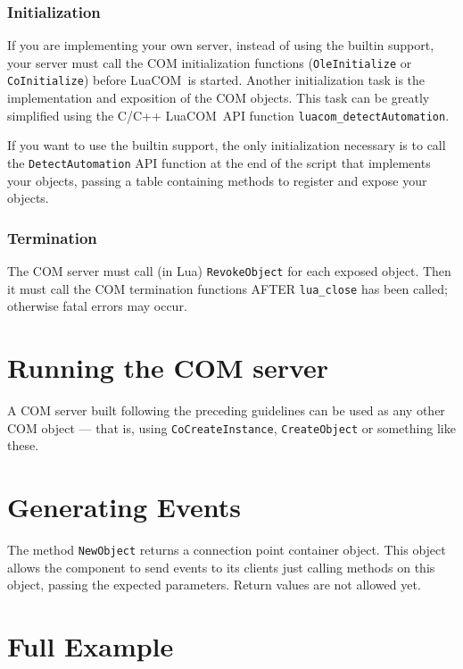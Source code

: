 \documentclass[11pt,a4paper,english]{report}
\newcommand{\techname}[1]{\mbox{#1}}
\newcommand{\luacom}{\techname{LuaCOM}}
\begin{document}
\subsubsection*{Initialization}

If you are implementing your own server, instead of using the builtin support, your server
must call the COM initialization functions (\texttt{OleInitialize} or \texttt{CoInitialize}) before \luacom\ is
started. Another initialization task is the implementation and
exposition of the COM objects. This task can be greatly simplified
using the C/C++ \luacom\ API function \verb+luacom_detectAutomation+.

If you want to use the builtin support, the only initialization necessary is to call
the \verb+DetectAutomation+ API function at the end of the script that implements your objects,
passing a table containing methods to register and expose your objects.

\subsubsection*{Termination}
The COM server must call (in Lua) \verb+RevokeObject+ for each
exposed object. Then it must call the COM termination functions AFTER
\verb+lua_close+ has been called; otherwise fatal errors may occur.



\section{Running the COM server}

A COM server built following the preceding guidelines can be used
as any other COM object --- that is, using \verb+CoCreateInstance+,
\verb+CreateObject+ or something like these.



\section{Generating Events}

The method \verb+NewObject+ returns a connection point container
object. This object allows the component to send events to its clients
just calling methods on this object, passing the expected
parameters. Return values are not allowed yet.

\section{Full Example}
\end{document}
